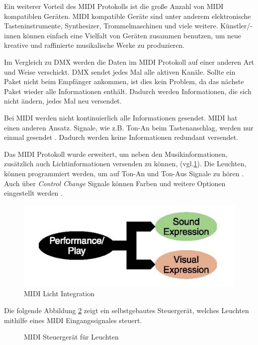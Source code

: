 Ein weiterer Vorteil des MIDI Protokolls ist die große Anzahl von MIDI kompatiblen Geräten. MIDI kompatible Geräte sind unter anderem elektronische Tasteninstrumente, Synthesizer, Trommelmaschinen und viele weitere. Künstler/-innen können einfach eine Vielfalt von Geräten zusammen benutzen, um neue kreative und raffinierte musikalische Werke zu produzieren.

Im Vergleich zu DMX werden die Daten im MIDI Protokoll auf einer anderen Art und Weise verschickt. DMX sendet jedes Mal alle aktiven Kanäle. Sollte ein Paket nicht beim Empfänger ankommen, ist dies kein Problem, da das nächste Paket wieder alle Informationen enthält. Dadurch werden Informationen, die sich nicht ändern, jedes Mal neu versendet.

Bei MIDI werden nicht kontinuierlich alle Informationen gesendet. MIDI hat einen anderen Ansatz. Signale, wie z.B. Ton-An beim Tastenanschlag, werden nur einmal gesendet \cite[S.3]{MIDI-DETAILED-SPECIFICATION}. Dadurch werden keine Informationen redundant versendet.

Das MIDI Protokoll wurde erweitert, um neben den Musikinformationen, zusätzlich auch Lichtinformationen versenden zu können, \cite[S.1]{MIDI-Visual-Control} (vgl.\ref{fig:Midi_Light_Integration}). Die Leuchten, können programmiert werden, um auf Ton-An und Ton-Aus Signale zu hören \cite[S.4]{MIDI-Visual-Control}. Auch über \emph{Control Change} Signale können Farben und weitere Optionen eingestellt werden \cite[S.6, ch. 2.2.1.2]{MIDI-Visual-Control}. 

\begin{figure}[H]
	\centering
	\includegraphics[width=.6\linewidth]{Pictures/MidiVisual}
	\caption{MIDI Licht Integration \cite[S. 1]{MIDI-Visual-Control}}
	\label{fig:Midi_Light_Integration}
\end{figure}

Die folgende Abbildung \ref{fig:MidiUseCase} zeigt ein selbstgebautes Steuergerät, welches Leuchten mithilfe eines MIDI Eingangssignales steuert.
\begin{figure}[H]
	\centering
	\caption{MIDI Steuergerät für Leuchten}
	\label{fig:MidiUseCase}
\end{figure}
 

